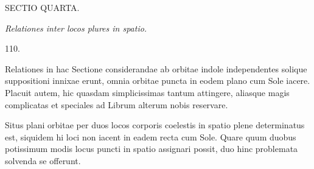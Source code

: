 \clearpage
{}
\begin{center}
{\large SECTIO QUARTA.}\par\medskip
\emph{Relationes inter locos plures in spatio.}\par\bigskip
\hypertarget{native-154-article110}{}110.
\end{center}
Relationes in hac Sectione considerandae ab orbitae indole independentes solique suppositioni innixae erunt, omnia orbitae puncta in eodem plano cum Sole iacere. Placuit autem, hic quasdam simplicissimas tantum attingere, aliasque magis complicatas et speciales ad Librum alterum nobis reservare.

Situs plani orbitae per duos locos corporis coelestis in spatio plene determinatus est, siquidem hi loci non iacent in eadem recta cum Sole. Quare quum duobus potissimum modis locus puncti in spatio assignari possit, duo hinc problemata solvenda se offerunt.

